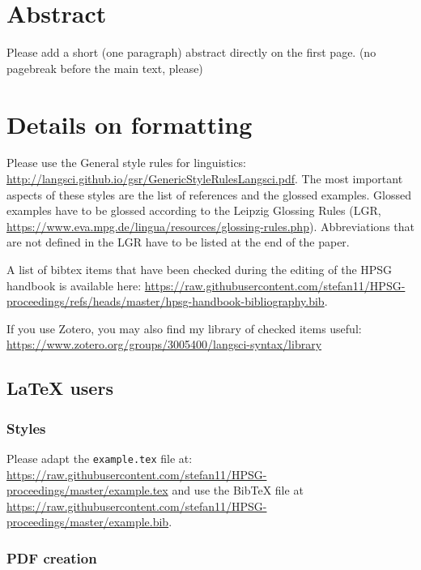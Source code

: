 \documentclass[11pt,a4paper,fleqn]{article}
\begin{document}
\section{Abstract}

Please add a short (one paragraph) abstract directly on the first page.
(no pagebreak before the main text, please)


\section{Details on formatting}

Please use the General style rules for linguistics:
\url{http://langsci.github.io/gsr/GenericStyleRulesLangsci.pdf}. The most important aspects of these
styles are the list of references and the glossed examples. Glossed examples have to be glossed
according to the Leipzig Glossing Rules (LGR,
\url{https://www.eva.mpg.de/lingua/resources/glossing-rules.php}). Abbreviations that are not
defined in the LGR have to be listed at the end of the paper.

A list of bibtex items that have been checked during the editing of the HPSG handbook is available
here:
\url{https://raw.githubusercontent.com/stefan11/HPSG-proceedings/refs/heads/master/hpsg-handbook-bibliography.bib}.

If you use Zotero, you may also find my library of checked items useful:
\url{https://www.zotero.org/groups/3005400/langsci-syntax/library}

\subsection{\LaTeX{} users}

\subsubsection{Styles}

Please adapt the \verb+example.tex+ file at:\newline
\url{https://raw.githubusercontent.com/stefan11/HPSG-proceedings/master/example.tex}\newline
and use the BibTeX file at \url{https://raw.githubusercontent.com/stefan11/HPSG-proceedings/master/example.bib}.

\subsubsection{PDF creation}
\end{document}
